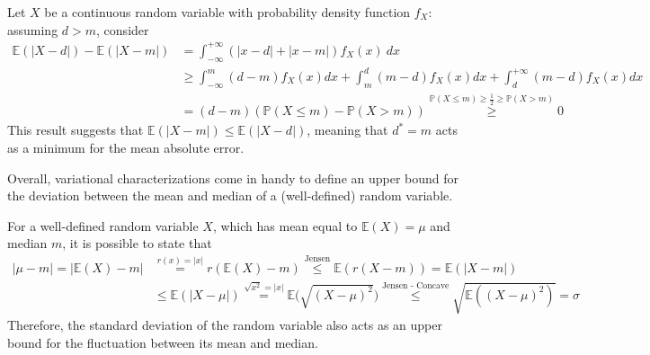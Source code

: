 \documentclass{report}
\begin{document}
\begin{proofbox}
    Let $\displaystyle X$ be a continuous random variable with probability density function $\displaystyle f_X$: assuming $\displaystyle d > m$, consider
    \begin{align*}
        \mathbb{E}(|X - d|) - \mathbb{E}(|X - m|)
            &= \int_{-\infty}^{+\infty} (|x - d| + |x - m|)f_X(x) \ dx \\
            &\ge \int_{-\infty}^m (d - m)f_X(x)dx + \int_m^d (m - d)f_X(x)dx + \int_d^{+\infty} (m - d)f_X(x)dx \\
            &= (d - m)(\mathbb{P}(X \leq m) - \mathbb{P}(X > m)) \stackrel{\mathbb{P}(X \leq m) \ge \frac{1}{2} \ge \mathbb{P}(X > m)}{\ge} 0
    \end{align*}
    This result suggests that $\displaystyle \mathbb{E}(|X - m|) \leq \mathbb{E}(|X - d|)$, meaning that $\displaystyle d^* = m$ acts as a minimum for the mean absolute error.
\end{proofbox}
\noindent Overall, variational characterizations come in handy to define an upper bound for the deviation between the mean and median of a (well-defined) random variable.
\begin{proofbox}
    For a well-defined random variable $\displaystyle X$, which has mean equal to $\displaystyle \mathbb{E}(X) = \mu$ and median $\displaystyle m$, it is possible to state that
    \begin{align*}
        |\mu - m| = |\mathbb{E}(X) - m|
            &\stackrel{r(x) = |x|}{=} r(\mathbb{E}(X) - m) \stackrel{\text{Jensen}}{\leq} \mathbb{E}(r(X - m)) = \mathbb{E}(|X - m|) \\
            &\leq \mathbb{E}(|X - \mu|) \stackrel{\sqrt{x^2} = |x|}{=} \mathbb{E}\bigg(\sqrt{(X - \mu)^2}\bigg) \stackrel{\text{Jensen - Concave}}{\leq} \sqrt{\mathbb{E}((X - \mu)^2)} = \sigma
    \end{align*}
    Therefore, the standard deviation of the random variable also acts as an upper bound for the fluctuation between its mean and median.
\end{proofbox}
\end{document}
